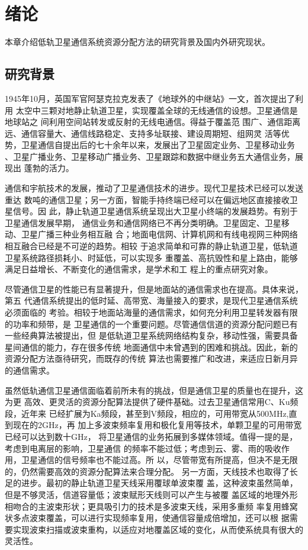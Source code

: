 \chapter{绪论}
\label{chp:installation}
本章介绍低轨卫星通信系统资源分配方法的研究背景及国内外研究现状。\par
{}
\section{研究背景}
\label{sec:tex_environment}
1945年10月，英国军官阿瑟克拉克发表了《地球外的中继站》一文，首次提出了利用
太空中三颗对地静止轨道卫星，实现覆盖全球的无线通信的设想。卫星通信是地球站之
间利用空间站转发或反射的无线电通信\cite{application2015min}。得益于覆盖范
围广、通信距离远、通信容量大、通信线路稳定、支持多址联接、建设周期短、组网灵
活等优势，卫星通信自提出后的七十余年以来，发展出了卫星固定业务、卫星移动业务
、卫星广播业务、卫星移动广播业务、卫星跟踪和数据中继业务五大通信业务，展现出
蓬勃的活力。\par

通信和宇航技术的发展，推动了卫星通信技术的进步。现代卫星技术已经可以发送重达
数吨的通信卫星；另一方面，智能手持终端已经可以在偏远地区直接接收卫星信号。因
此，静止轨道卫星通信系统呈现出大卫星小终端的发展趋势。有别于卫星通信发展早期，
通信业务和通信网络已不再分类明确。卫星固定、卫星移动、卫星广播三种业务相互融
合；地面电信网、计算机网和有线电视网三种网络相互融合已经是不可逆的趋势。相较
于追求简单和可靠的静止轨道卫星，低轨道卫星系统路径损耗小、时延低，可以实现多
重覆盖、高抗毁性和星上路由，能够满足日益增长、不断变化的通信需求，是学术和工
程上的重点研究对象。\par%

尽管通信卫星的性能已有显著提升，但是地面站的通信需求也在提高。具体来说，第五
代通信系统提出的低时延、高带宽、海量接入的要求，是现代卫星通信系统必须面临的
考验。相较于地面站海量的通信需求，如何充分利用卫星转发器有限的功率和频带，是
卫星通信的一个重要问题。尽管通信信道的资源分配问题已有一些经典算法被提出，但
是低轨道卫星系统网络结构复杂，移动性强，需要具备星间通信的能力，存在很多传统
地面通信中未曾遇到的困难和挑战。因此，新的资源分配方法亟待研究，而既存的传统
算法也需要推广和改进，来适应日新月异的通信需求。\par%

虽然低轨通信卫星通信面临着前所未有的挑战，但是通信卫星的质量也在提升，这为更
高效、更灵活的资源分配算法提供了硬件基础。过去卫星通信常用C、Ku频段，近年来
已经扩展为Ka频段，甚至到V频段，相应的，可用带宽从500MHz,直到现在的2GHz，再
加上多波束频率复用和极化复用等技术，单颗卫星的可用带宽已经可以达到数十GHz，
将卫星通信的业务拓展到多媒体领域。值得一提的是，考虑到电离层的影响，卫星通信
的频率不能过低；考虑到云、雾、雨的吸收作用，卫星通信的信号频率也不能过高。所
以，尽管带宽有所提高，但决不是无限的，仍然需要高效的资源分配算法来合理分配。
另一方面，天线技术也取得了长足的进步。最初的静止轨道卫星天线采用覆球单波束覆
盖，这种波束虽然简单，但是不够灵活，信道容量低；波束赋形天线则可以产生与被覆
盖区域的地理外形相吻合的主波束形状；更具吸引力的技术是多波束天线，采用多重频
率复用蜂窝状多点波束覆盖，可以进行实现频率复用，使通信容量成倍增加，还可以根
据需要实现波束扫描或波束重构，以适应对地覆盖区域的变化，从而使系统具有很大的
灵活性。\par%

